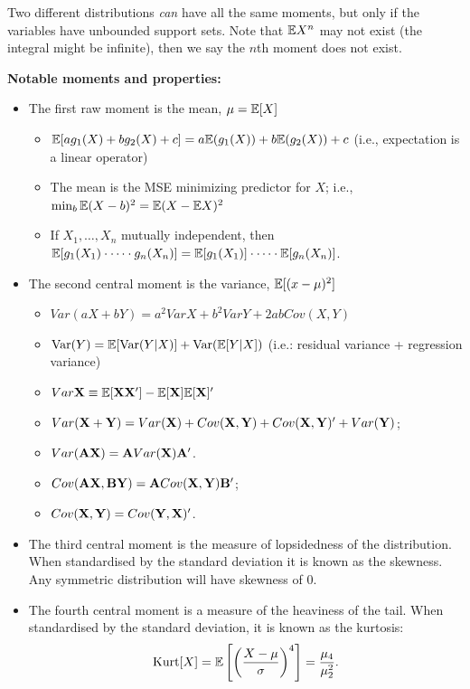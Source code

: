 \documentclass[DIV=14,titlepage=false]{scrreprt}
\begin{document}
Two different distributions \textit{can} have all the same moments, but only if the variables have unbounded support sets. Note that $\mathbb{E} X^n$ may not exist (the integral might be infinite), then we say the $n$th moment does not exist.

\textbf{Notable moments and properties:}
\begin{itemize}
  \item The first raw moment is the mean, $\mu = \mathbb{E} [X]$
  \begin{itemize}
    \item $ \mathbb{E} [a g_1(X) + b g_2(X) + c] = a \mathbb{E}(g_1(X)) + b \mathbb{E}(g_2(X)) + c $ (i.e., expectation is a linear operator)
    \item The mean is the MSE minimizing predictor for $ X $; i.e., $ \min_b \mathbb{E} (X - b)^2 = \mathbb{E} (X - \mathbb{E} X)^2 $
    \item If $ X_1, \dotsc , X_n $ mutually independent, then $ \mathbb{E} [ g_1(X_1) \cdot \dotsb \cdot g_n(X_n) ] = \mathbb{E} [ g_1(X_1)] \cdot \dotsb \cdot \mathbb{E} [g_n(X_n) ] $.
  \end{itemize}
  \item The second central moment is the variance, $\mathbb{E} [(x-\mu)^2]$
  \begin{itemize}
    \item $Var(aX + bY) = a^2 VarX + b^2 VarY + 2ab Cov(X,Y) $
    \item $\text{Var}(Y) = \mathbb{E} [\text{Var}(Y|X)] + \text{Var}(\mathbb{E} [Y|X])$ (i.e.: residual variance + regression variance)
    \item $ Var \mathbf{X} \equiv \mathbb{E} [ \mathbf{X} \mathbf{X}' ] - \mathbb{E} [ \mathbf{X} ] \mathbb{E} [ \mathbf{X} ]' $
    \item $ Var ( \mathbf{X} + \mathbf{Y} ) = Var ( \mathbf{X} ) + Cov ( \mathbf{X} , \mathbf{Y} ) + Cov ( \mathbf{X} , \mathbf{Y} )' + Var ( \mathbf{Y} ) $;
    \item $ Var (\mathbf{A} \mathbf{X}) = \mathbf{A} Var ( \mathbf{X} ) \mathbf{A}' $.
    \item $ Cov (\mathbf{A} \mathbf{X}, \mathbf{B} \mathbf{Y}) = \mathbf{A} Cov (\mathbf{X}, \mathbf{Y}) \mathbf{B}' $;
    \item $ Cov (\mathbf{X}, \mathbf{Y}) = Cov ( \mathbf{Y} , \mathbf{X} )' $.
  
  \end{itemize}
  \item The third central moment is the measure of lopsidedness of the distribution. When standardised by the standard deviation it is known as the skewness. Any symmetric distribution will have skewness of 0.
  \item The fourth central moment is a measure of the heaviness of the tail. When standardised by the standard deviation, it is known as the kurtosis:
  \[
  \text{Kurt}[X] = \mathbb{E}\left[ \left( \frac{X - \mu}{\sigma} \right)^4 \right]= \frac{\mu_4}{\mu^2_2}.
  \]
\end{itemize}
\end{document}
